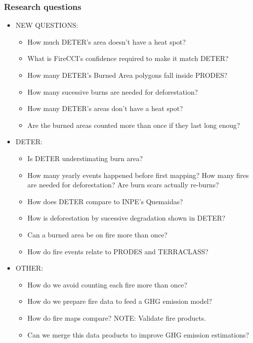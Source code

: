\documentclass{beamer}
\begin{document}
\begin{frame}[t, allowframebreaks]
    \frametitle{Research questions}
    \begin{itemize}
        \item NEW QUESTIONS:
        \begin{itemize}
            \item How much DETER's area doesn't have a heat spot?
            \item What is FireCCI's confidence required to make it match DETER?
            \item How many DETER's Burned Area polygons fall inside PRODES?
            \item How many sucessive burns are needed for deforestation?
            \item How many DETER's areas don't have a heat spot?
            \item Are the burned areas counted more than once if they last long
                enoug?
        \end{itemize}
        \item DETER:
        \begin{itemize}
            \item Is DETER understimating burn area?
            \item How many yearly events happened before first mapping? How 
                many fires are needed for deforestation? Are burn scars 
                actually re-burns?
            \item How does DETER compare to INPE's Quemaidas?
            \item How is deforestation by sucessive degradation shown in DETER?
            \item Can a burned area be on fire more than once?
            \item How do fire events relate to PRODES and TERRACLASS?
        \end{itemize}
        \item OTHER:
        \begin{itemize}
            \item How do we avoid counting each fire more than once? 
            \item How do we prepare fire data to feed a GHG emission model?
            \item How do fire maps compare? NOTE: Validate fire products. 
            \item Can we merge this data products to improve GHG emission 
                estimations?

\end{itemize}
\end{itemize}
\end{frame}
\end{document}
